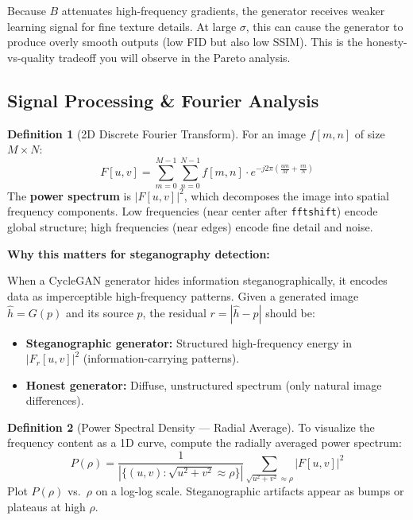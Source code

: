 \documentclass[11pt,a4paper]{article}
\theoremstyle{definition}
\newtheorem{definition}{Definition}[section]
\begin{document}
\begin{edgecase}
Because $B$ attenuates high-frequency gradients, the generator receives weaker learning signal for fine texture details. At large $\sigma$, this can cause the generator to produce overly smooth outputs (low FID but also low SSIM). This is the honesty-vs-quality tradeoff you will observe in the Pareto analysis.
\end{edgecase}

\subsection{Signal Processing \& Fourier Analysis}

\begin{definition}[2D Discrete Fourier Transform]
For an image $f[m,n]$ of size $M \times N$:
\begin{equation}
    F[u,v] = \sum_{m=0}^{M-1} \sum_{n=0}^{N-1} f[m,n] \cdot e^{-j2\pi\left(\frac{um}{M} + \frac{vn}{N}\right)}
\end{equation}
The \textbf{power spectrum} is $|F[u,v]|^2$, which decomposes the image into spatial frequency components. Low frequencies (near center after \texttt{fftshift}) encode global structure; high frequencies (near edges) encode fine detail and noise.
\end{definition}

\textbf{Why this matters for steganography detection:}

When a CycleGAN generator hides information steganographically, it encodes data as imperceptible high-frequency patterns. Given a generated image $\hat{h} = G(p)$ and its source $p$, the residual $r = |\hat{h} - p|$ should be:
\begin{itemize}
    \item \textbf{Steganographic generator:} Structured high-frequency energy in $|F_r[u,v]|^2$ (information-carrying patterns).
    \item \textbf{Honest generator:} Diffuse, unstructured spectrum (only natural image differences).
\end{itemize}

\begin{definition}[Power Spectral Density --- Radial Average]
To visualize the frequency content as a 1D curve, compute the radially averaged power spectrum:
\begin{equation}
    P(\rho) = \frac{1}{|\{(u,v) : \sqrt{u^2+v^2} \approx \rho\}|} \sum_{\sqrt{u^2+v^2} \approx \rho} |F[u,v]|^2
\end{equation}
Plot $P(\rho)$ vs.\ $\rho$ on a log-log scale. Steganographic artifacts appear as bumps or plateaus at high $\rho$.
\end{definition}
\end{document}
